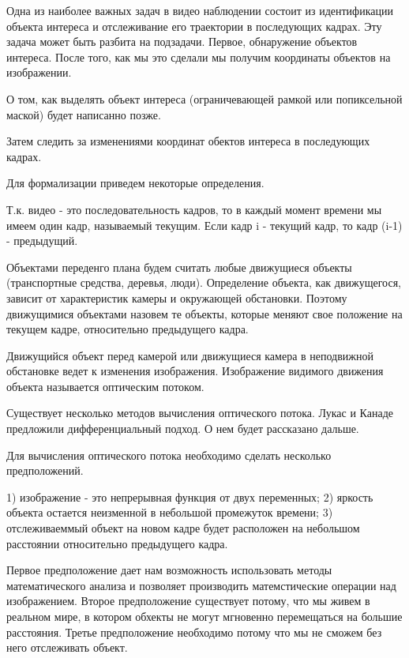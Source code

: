 \documentclass[12pt,a4paper,oneside,titlepage]{article}
\begin{document}
Одна из наиболее важных задач в видео наблюдении состоит из идентификации объекта интереса и отслеживание его траектории в последующих кадрах.
Эту задача может быть разбита на подзадачи.
Первое, обнаружение объектов интереса.
После того, как мы это сделали мы получим координаты объектов на изображении.

О том, как выделять объект интереса (ограничевающей рамкой или попиксельной маской) будет написанно позже.

Затем следить за изменениями координат обектов интереса в последующих кадрах.

Для формализации приведем некоторые определения.

Т.к. видео - это последовательность кадров, то в каждый момент времени мы имеем один кадр, называемый текущим.
Если кадр i - текущий кадр, то кадр (i-1) - предыдущий.

Объектами переденго плана будем считать любые движущиеся объекты (транспортные средства, деревья, люди).
Определение объекта, как движущегося, зависит от характеристик камеры и окружающей обстановки.
Поэтому движущимися объектами назовем те объекты, которые меняют свое положение на текущем кадре, относительно предыдущего кадра.

Движущийся объект перед камерой или движущиеся камера в неподвижной обстановке ведет к изменения изображения.
Изображение видимого движения объекта называется оптическим потоком.

Существует несколько методов вычисления оптического потока.
Лукас и Канаде предложили дифференциальный подход.
О нем будет рассказано дальше.



Для вычисления оптического потока необходимо сделать несколько предположений.

1) изображение - это непрерывная функция от двух переменных;
2) яркость объекта остается неизменной в небольшой промежуток времени;
3) отслеживаеммый объект на новом кадре будет расположен на небольшом расстоянии относительно предыдущего кадра.

Первое предположение дает нам возможность использовать методы математического анализа и позволяет производить матемстические операции над изображением.
Второе предположение существует потому, что мы живем в реальном мире, в котором  обхекты не могут мгновенно перемещаться на большие расстояния.
Третье предположение необходимо потому что мы не сможем без него отслеживать объект.
\end{document}
